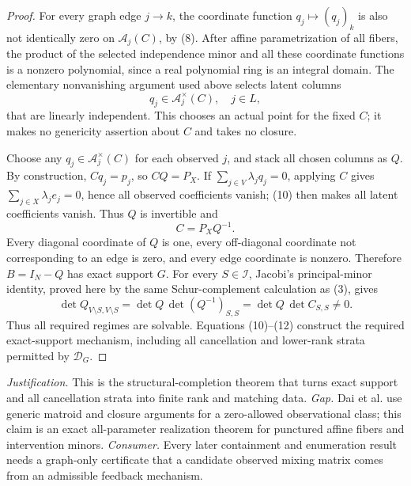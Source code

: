 \documentclass{article}
\begin{document}
\begin{proof}
For every graph edge \(j\to k\), the coordinate function \(q_j\mapsto(q_j)_k\) is also not identically zero on \(\mathcal A_j(C)\), by (8).  After affine parametrization of all fibers, the product of the selected independence minor and all these coordinate functions is a nonzero polynomial, since a real polynomial ring is an integral domain.  The elementary nonvanishing argument used above selects latent columns
\[
q_j\in\mathcal A_j^\times(C),\quad j\in L,                              \tag{10}
\]
that are linearly independent.  This chooses an actual point for the fixed \(C\); it makes no genericity assertion about \(C\) and takes no closure.

Choose any \(q_j\in\mathcal A_j^\times(C)\) for each observed \(j\), and stack all chosen columns as \(Q\).  By construction, \(Cq_j=p_j\), so \(CQ=P_X\).  If \(\sum_{j\in V}\lambda_jq_j=0\), applying \(C\) gives \(\sum_{j\in X}\lambda_je_j=0\), hence all observed coefficients vanish; (10) then makes all latent coefficients vanish.  Thus \(Q\) is invertible and
\[
C=P_XQ^{-1}.                                                             \tag{11}
\]
Every diagonal coordinate of \(Q\) is one, every off-diagonal coordinate not corresponding to an edge is zero, and every edge coordinate is nonzero.  Therefore \(B=I_N-Q\) has exact support \(G\).  For every \(S\in\mathcal I\), Jacobi's principal-minor identity, proved here by the same Schur-complement calculation as (3), gives
\[
\det Q_{V\setminus S,V\setminus S}=\det Q\,\det (Q^{-1})_{S,S}
=\det Q\,\det C_{S,S}\neq0.                                           \tag{12}
\]
Thus all required regimes are solvable.  Equations (10)--(12) construct the required exact-support mechanism, including all cancellation and lower-rank strata permitted by \(\mathcal D_G\).
\end{proof}
\par\smallskip\noindent \textit{Justification.} This is the structural-completion theorem that turns exact support and all cancellation strata into finite rank and matching data. \textit{Gap.} Dai et al. use generic matroid and closure arguments for a zero-allowed observational class; this claim is an exact all-parameter realization theorem for punctured affine fibers and intervention minors. \textit{Consumer.} Every later containment and enumeration result needs a graph-only certificate that a candidate observed mixing matrix comes from an admissible feedback mechanism.
\end{document}
